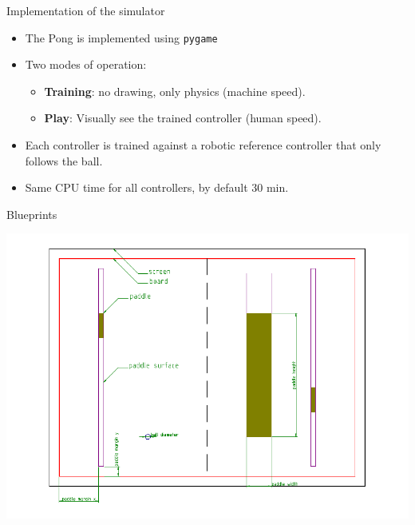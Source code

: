 \documentclass[serif, 11pt]{beamer}
\begin{document}
\begin{frame}{Implementation of the simulator}

\begin{itemize}
	\item The Pong is implemented using \texttt{pygame}
	\item Two modes of operation:
	\begin{itemize}
		\item \textbf{Training}: no drawing, only physics (machine speed).
		\item \textbf{Play}: Visually see the trained controller (human speed).
	\end{itemize}
	\item Each controller is trained against a robotic reference controller that 
		only follows the ball.
	\item Same CPU time for all controllers, by default 30 min.
\end{itemize}


\end{frame}


\begin{frame}{Blueprints}
	\begin{center}
		\includegraphics[width=\linewidth]{pong.pdf}
	\end{center}
\end{frame}
\end{document}
